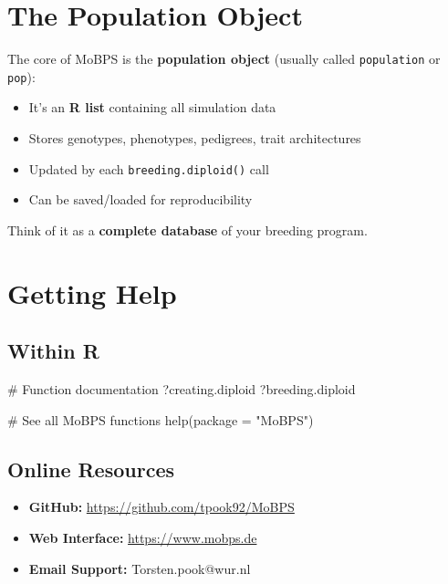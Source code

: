 \documentclass[
  letterpaper,
]{book}
\newenvironment{Shaded}{\begin{snugshade}}{\end{snugshade}}
\newcommand{\AttributeTok}[1]{\textcolor[rgb]{0.40,0.45,0.13}{#1}}
\newcommand{\CommentTok}[1]{\textcolor[rgb]{0.37,0.37,0.37}{#1}}
\newcommand{\FunctionTok}[1]{\textcolor[rgb]{0.28,0.35,0.67}{#1}}
\newcommand{\NormalTok}[1]{\textcolor[rgb]{0.00,0.23,0.31}{#1}}
\newcommand{\StringTok}[1]{\textcolor[rgb]{0.13,0.47,0.30}{#1}}
\providecommand{\tightlist}{%
  \setlength{\itemsep}{0pt}\setlength{\parskip}{0pt}}
\begin{document}
\section{The Population Object}\label{the-population-object}

The core of MoBPS is the \textbf{population object} (usually called
\texttt{population} or \texttt{pop}):

\begin{itemize}
\tightlist
\item
  It's an \textbf{R list} containing all simulation data
\item
  Stores genotypes, phenotypes, pedigrees, trait architectures
\item
  Updated by each \texttt{breeding.diploid()} call
\item
  Can be saved/loaded for reproducibility
\end{itemize}

Think of it as a \textbf{complete database} of your breeding program.

\section{Getting Help}\label{getting-help-1}

\subsection{Within R}\label{within-r}

\begin{Shaded}
\begin{Highlighting}[]
\CommentTok{\# Function documentation}
\NormalTok{?creating.diploid}
\NormalTok{?breeding.diploid}

\CommentTok{\# See all MoBPS functions}
\FunctionTok{help}\NormalTok{(}\AttributeTok{package =} \StringTok{"MoBPS"}\NormalTok{)}
\end{Highlighting}
\end{Shaded}

\subsection{Online Resources}\label{online-resources}

\begin{itemize}
\tightlist
\item
  \textbf{GitHub:} \url{https://github.com/tpook92/MoBPS}
\item
  \textbf{Web Interface:} \url{https://www.mobps.de}
\item
  \textbf{Email Support:} Torsten.pook@wur.nl
\end{itemize}
\end{document}
